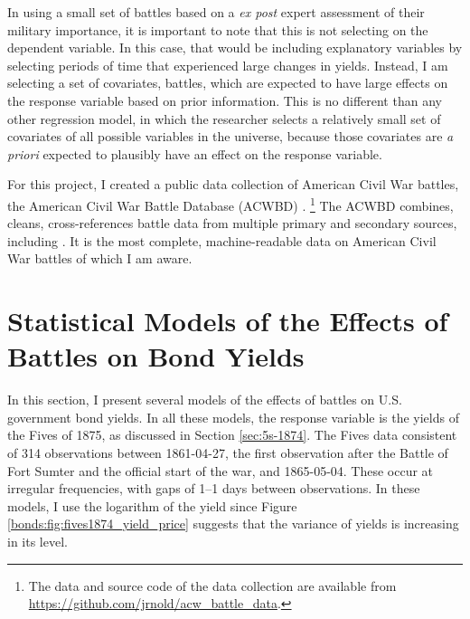 In using a small set of battles based on a \textit{ex post} expert assessment of their military importance, it is important to note that this is not selecting on the dependent variable.
In this case, that would be including explanatory variables by selecting periods of time that experienced large changes in yields.
Instead, I am selecting a set of covariates, \ie{}battles, which are expected to have large effects on the response variable based on prior information.
This is no different than any other regression model, in which the researcher selects a relatively small set of covariates of all possible variables in the universe, because those covariates are \textit{a priori} expected to plausibly have an effect on the response variable.

For this project, I created a public data collection of American Civil War battles, the American Civil War Battle Database (ACWBD) \parencite{Arnold2015b}.%
\footnote{The data and source code of the data collection are available from \url{https://github.com/jrnold/acw_battle_data}.}
The ACWBD combines, cleans, cross-references battle data from multiple primary and secondary sources, including \textcites{Phisterer1883}{Livermore1900}{Bodart1908}{dyer1908_war_rebel}{KennedyConservation1998}{CWSAC1993}{cwsac2012}.
It is the most complete, machine-readable data on American Civil War battles of which I am aware.



\section{Statistical Models of the Effects of Battles on Bond Yields}
\label{sec:model-war-events}

In this section, I present several models of the effects of battles on U.S. government bond yields.
In all these models, the response variable is the yields of the Fives of 1875, as discussed in Section \ref{sec:5s-1874}.
The Fives data consistent of 314 observations between 1861-04-27, the first observation after the Battle of Fort Sumter and the official start of the war, and 1865-05-04.
These occur at irregular frequencies, with gaps of 1--1 days between observations.
In these models, I use the logarithm of the yield since Figure \ref{bonds:fig:fives1874_yield_price} suggests that the variance of yields is increasing in its level.

